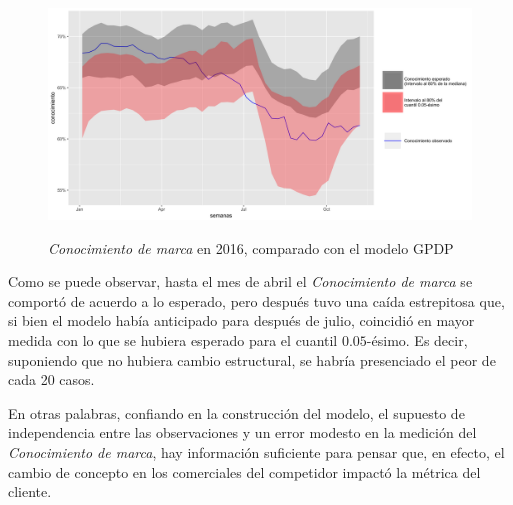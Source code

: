 \begin{figure}[H]
	\centering
	\caption{\textit{Conocimiento de marca} en 2016, comparado con el modelo GPDP}
	\includegraphics[width=1\textwidth]{Figures/MarketResearch/goals_2016.png}
	\captionsetup{singlelinecheck=off,font=footnotesize}
	\label{awareness_fit}
\end{figure}

Como se puede observar, hasta el mes de abril el \textit{Conocimiento de marca} se comport\'o de acuerdo a lo esperado, pero despu\'es tuvo una ca\'ida estrepitosa que, si bien el modelo hab\'ia anticipado para despu\'es de julio, coincidi\'o en mayor medida con lo que se hubiera esperado para el cuantil $0.05$-\'esimo. Es decir, suponiendo que no hubiera cambio estructural, se habr\'ia presenciado el peor de cada 20 casos.

En otras palabras, confiando en la construcci\'on del modelo, el supuesto de independencia entre las observaciones y un error modesto en la medici\'on del \textit{Conocimiento de marca}, hay informaci\'on suficiente para pensar que, en efecto, el cambio de concepto en los comerciales del competidor impact\'o la m\'etrica del cliente.


\newpage
